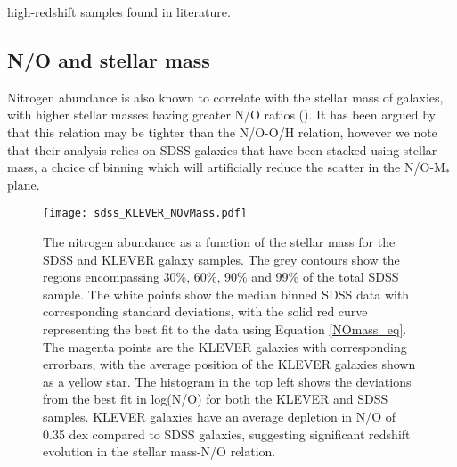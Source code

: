 \documentclass[usenatbib]{mnras} %
\begin{document}
high-redshift samples found in literature. 






\subsection{N/O and stellar mass}


Nitrogen abundance is also known to correlate with the stellar mass of galaxies, with higher stellar masses having greater N/O ratios (\citealt{PMC_2009}). It has been argued by \cite{AndrewsMartini_2013} that this relation may be tighter than the N/O-O/H relation, however we note that their analysis relies on SDSS galaxies that have been stacked using stellar mass, a choice of binning which will artificially reduce the scatter in the N/O-M$_*$ plane. 

\begin{figure}
\texttt{[image: sdss\_KLEVER\_NOvMass.pdf]}
\caption{The nitrogen abundance as a function of the stellar mass for the SDSS and KLEVER galaxy samples. The grey contours show the regions encompassing 30\%, 60\%, 90\% and 99\% of the total SDSS sample. The white points show the median binned SDSS data with corresponding standard deviations, with the solid red curve representing the best fit to the data using Equation \ref{NOmass_eq}. The magenta points are the KLEVER galaxies with corresponding errorbars, with the average position of the KLEVER galaxies shown as a yellow star. The histogram in the top left shows the deviations from the best fit in log(N/O) for both the KLEVER and SDSS samples. KLEVER galaxies have an average depletion in N/O of 0.35 dex compared to SDSS galaxies, suggesting significant redshift evolution in the stellar mass-N/O relation.}
\label{fig:SDSS_KLEVER_NOMass}
\end{figure}
\end{document}
